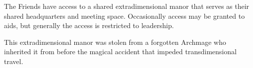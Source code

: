 The Friends have access to a shared extradimensional manor that serves as their shared headquarters and meeting space.
Occasionally access may be granted to aids, but generally the access is restricted to leadership.

This extradimensional manor was stolen from a forgotten Archmage who inherited it from before the magical accident that impeded transdimensional travel.
